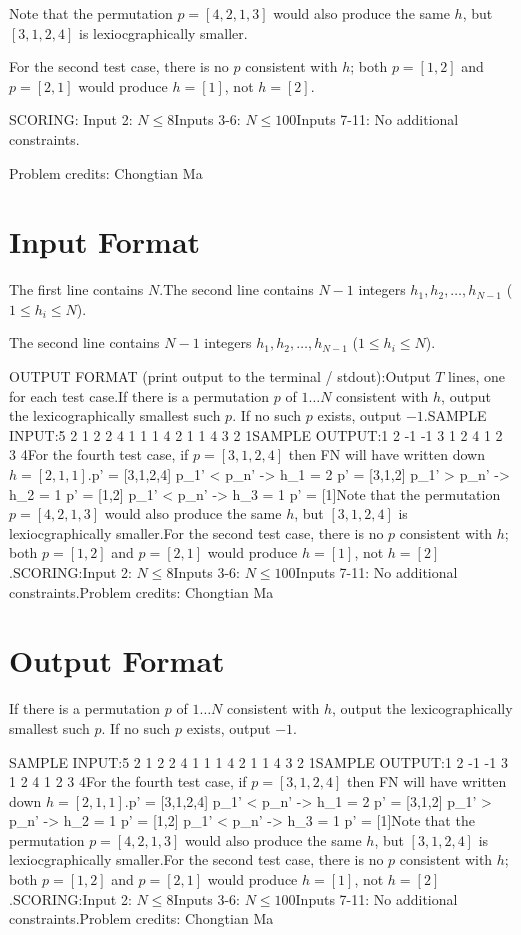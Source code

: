 \documentclass[12pt]{article}
\begin{document}
Note that the permutation $p=[4,2,1,3]$ would also produce the same $h$, but
$[3,1,2,4]$ is lexiocgraphically smaller.

For the second test case, there is no $p$ consistent with $h$; both $p=[1,2]$
and $p=[2,1]$ would produce $h=[1]$, not $h=[2]$.

SCORING:
Input 2: $N\le 8$Inputs 3-6: $N\le 100$Inputs 7-11: No additional constraints.


Problem credits: Chongtian Ma



\section*{Input Format}
The first line contains $N$.The second line contains $N - 1$ integers $h_1, h_2, \dots, h_{N-1}$
($1\le h_i\le N$).

The second line contains $N - 1$ integers $h_1, h_2, \dots, h_{N-1}$
($1\le h_i\le N$).

OUTPUT FORMAT (print output to the terminal / stdout):Output $T$ lines, one for each test case.If there is a permutation $p$ of $1\dots N$ consistent with $h$, output the
lexicographically smallest such $p$. If no such $p$ exists, output $-1$.SAMPLE INPUT:5
2
1
2
2
4
1 1 1
4
2 1 1
4
3 2 1SAMPLE OUTPUT:1 2
-1
-1
3 1 2 4
1 2 3 4For the fourth test case, if $p=[3,1,2,4]$ then FN will have written down
$h=[2,1,1]$.p' = [3,1,2,4]
p_1' < p_n' -> h_1 = 2
p' = [3,1,2]
p_1' > p_n' -> h_2 = 1
p' = [1,2]
p_1' < p_n' -> h_3 = 1
p' = [1]Note that the permutation $p=[4,2,1,3]$ would also produce the same $h$, but
$[3,1,2,4]$ is lexiocgraphically smaller.For the second test case, there is no $p$ consistent with $h$; both $p=[1,2]$
and $p=[2,1]$ would produce $h=[1]$, not $h=[2]$.SCORING:Input 2: $N\le 8$Inputs 3-6: $N\le 100$Inputs 7-11: No additional constraints.Problem credits: Chongtian Ma

\section*{Output Format}
If there is a permutation $p$ of $1\dots N$ consistent with $h$, output the
lexicographically smallest such $p$. If no such $p$ exists, output $-1$.

SAMPLE INPUT:5
2
1
2
2
4
1 1 1
4
2 1 1
4
3 2 1SAMPLE OUTPUT:1 2
-1
-1
3 1 2 4
1 2 3 4For the fourth test case, if $p=[3,1,2,4]$ then FN will have written down
$h=[2,1,1]$.p' = [3,1,2,4]
p_1' < p_n' -> h_1 = 2
p' = [3,1,2]
p_1' > p_n' -> h_2 = 1
p' = [1,2]
p_1' < p_n' -> h_3 = 1
p' = [1]Note that the permutation $p=[4,2,1,3]$ would also produce the same $h$, but
$[3,1,2,4]$ is lexiocgraphically smaller.For the second test case, there is no $p$ consistent with $h$; both $p=[1,2]$
and $p=[2,1]$ would produce $h=[1]$, not $h=[2]$.SCORING:Input 2: $N\le 8$Inputs 3-6: $N\le 100$Inputs 7-11: No additional constraints.Problem credits: Chongtian Ma
\end{document}
